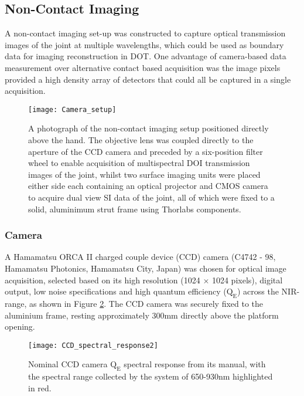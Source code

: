 \documentclass[twoside]{bhamthesis}
\theoremstyle{definition}
\begin{document}

\subsection{Non-Contact Imaging}

A non-contact imaging set-up was constructed to capture optical transmission images of the joint at multiple wavelengths, which could be used as boundary data for imaging reconstruction in DOT. One advantage of camera-based data measurement over alternative contact based acquisition was the image pixels provided a high density array of detectors that could all be captured in a single acquisition.

\begin{figure}[!ht]
\centering
  \centering
  \texttt{[image: Camera\_setup]}
	\caption{A photograph of the non-contact imaging setup positioned directly above the hand. The objective lens was coupled directly to the aperture of the CCD camera and preceded by a six-position filter wheel to enable acquisition of multispectral DOI transmission images of the joint, whilst two surface imaging units were placed either side each containing an optical projector and CMOS camera to acquire dual view SI data of the joint, all of which were fixed to a solid, aluminimum strut frame using Thorlabs components.}
  \label{fig:Camera_setup}
\end{figure}

\subsubsection{Camera}

A Hamamatsu ORCA II charged couple device (CCD) camera (C4742 - 98, Hamamatsu Photonics, Hamamatsu City, Japan) was chosen for optical image acquisition, selected based on its high resolution (1024 $\times$ 1024 pixels), digital output, low noise specifications and high quantum efficiency ($\mathrm{Q_E}$) across the NIR-range, as shown in Figure \ref{fig:CCD_spectral_response}. The CCD camera was securely fixed to the aluminium frame, resting approximately 300mm directly above the platform opening.

\begin{figure}[!ht]
\centering
  \centering
  \texttt{[image: CCD\_spectral\_response2]}
	\caption{Nominal CCD camera $\mathrm{Q_E}$ spectral response from its manual, with the spectral range collected by the system of 650-930nm highlighted in red.}
  \label{fig:CCD_spectral_response}
\end{figure}
 
\end{document}
